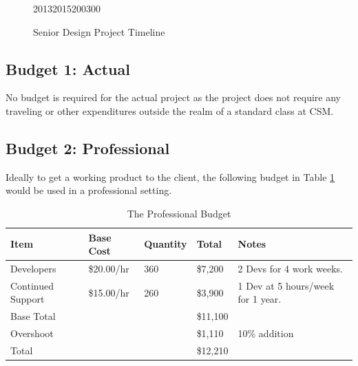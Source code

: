 \documentclass[12pt]{article}
\begin{document}
\begin{figure}[H]

\begin{timeline}{2013}{2015}{200}{300}
  
  
\end{timeline}
\caption{Senior Design Project Timeline}
\end{figure}

\subsection{Budget 1: Actual}

No budget is required for the actual project as the project does not require any traveling or other expenditures outside the realm of a standard class at CSM.

\subsection{Budget 2: Professional}

Ideally to get a working product to the client, the following budget in Table \ref{TAB:BUG} would be used in a professional setting. 

\begin{table}[H]
\caption{The Professional Budget}
\begin{tabular}{ l | l | l || l | l}
  \hline                        
  Item & Base Cost & Quantity & Total & Notes \\ \hline
  Developers & \$20.00/hr & 360 & \$7,200 & 2 Devs for 4 work weeks.\\
  Continued Support & \$15.00/hr & 260 & \$3,900 & 1 Dev at 5 hours/week for 1 year.\\ \hline
  Base Total & & & \$11,100 & \\
  Overshoot & & & \$1,110 & 10\% addition\\ \hline
  Total & & & \$12,210 & \\
  \hline  
\end{tabular} 
\label{TAB:BUG}
\end{table}
\end{document}
